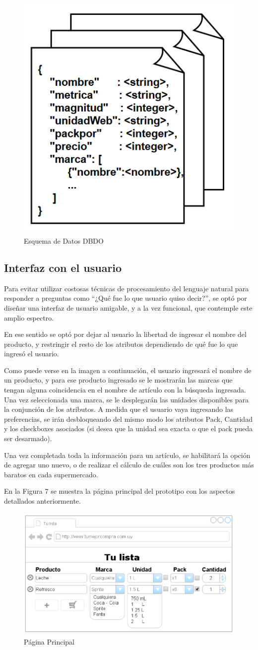 \documentclass[12pt]{article} %
\begin{document}
\begin{figure}[H]
\includegraphics[height=0.30\textwidth]{documento}
\centering
\caption{Esquema de Datos DBDO}
\end{figure}


\subsection{Interfaz con el usuario}
Para evitar utilizar costosas técnicas de procesamiento del lenguaje natural para responder a preguntas como “¿Qué fue lo que usuario quiso decir?”, se optó por diseñar una interfaz de usuario amigable, y a la vez funcional, que contemple este amplio espectro. 

En ese sentido se optó por dejar al usuario la libertad de ingresar el nombre del producto, y restringir el resto de los atributos dependiendo de qué fue lo que ingresó el usuario.

Como puede verse en la imagen a continuación, el usuario ingresará el nombre de un producto, y para ese producto ingresado se le mostrarán las marcas que tengan alguna coincidencia en el nombre de artículo con la búsqueda ingresada. Una vez seleccionada una marca, se le desplegarán las unidades disponibles para la conjunción de los atributos. A medida que el usuario vaya ingresando las preferencias, se irán desbloqueando del mismo modo los atributos Pack, Cantidad y los checkboxes asociados (si desea que la unidad sea exacta o que el pack pueda ser desarmado).

Una vez completada toda la información para un artículo, se habilitará la opción de agregar uno nuevo, o de realizar el cálculo de cuáles son los tres productos más baratos en cada supermercado.

En la Figura 7 se muestra la página principal del prototipo con los aspectos detallados anteriormente.

\begin{figure}[H]
\includegraphics[height=0.30\textwidth]{interfaz_usuario}
\centering
\caption{Página Principal}
\end{figure}
\end{document}
